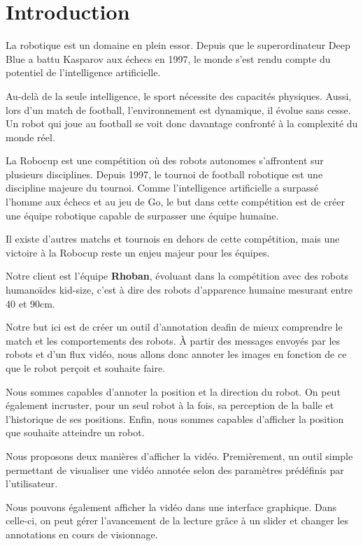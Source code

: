 \chapter{Introduction}

La robotique est un domaine en plein essor. Depuis que le
superordinateur Deep Blue a battu Kasparov aux échecs en 1997, le
monde s'est rendu compte du potentiel de l'intelligence
artificielle.
\bigskip

Au-delà de la seule intelligence, le sport nécessite des capacités
physiques. Aussi, lors d'un match de football, l'environnement est
dynamique, il évolue sans cesse. Un robot qui joue au football se
voit donc davantage confronté à la complexité du monde réel.
\bigskip

La Robocup est une compétition où des robots autonomes
s'affrontent sur plusieurs disciplines. Depuis 1997, le tournoi de
football robotique est une discipline majeure du tournoi. 
Comme l'intelligence artificielle a surpassé l'homme aux échecs et
au jeu de Go, le but dans cette compétition est de créer une
équipe robotique capable de surpasser une équipe humaine.
\bigskip

Il existe d'autres matchs et tournois en dehors de cette
compétition, mais une victoire à la Robocup reste un enjeu majeur
pour les équipes.
\bigskip

Notre client est l'équipe \textbf{Rhoban}, évoluant dans la
compétition avec des robots humanoïdes kid-size, c'est à dire des
robots d'apparence humaine mesurant entre 40 et 90cm.
\bigskip

Notre but ici est de créer un outil d'annotation deafin de mieux
comprendre le match et les comportements des robots. À partir des
messages envoyés par les robots et d'un flux vidéo, nous allons
donc annoter les images en fonction de ce que le robot perçoit et
souhaite  faire.
\bigskip

Nous sommes capables d'annoter la position et la direction du
robot. On peut également incruster, pour un seul robot à la fois,
sa perception de la balle et l'historique de ses positions. Enfin,
nous sommes capables d'afficher la position que souhaite atteindre
un robot.
\bigskip

Nous proposons deux manières d'afficher la vidéo. Premièrement, un
outil simple permettant de visualiser une vidéo annotée selon des
paramètres prédéfinis par l'utilisateur.
\bigskip

Nous pouvons également afficher la vidéo dans une interface
graphique. Dans celle-ci, on peut gérer l'avancement de la lecture
grâce à un slider et changer les annotations en cours de
visionnage. 

